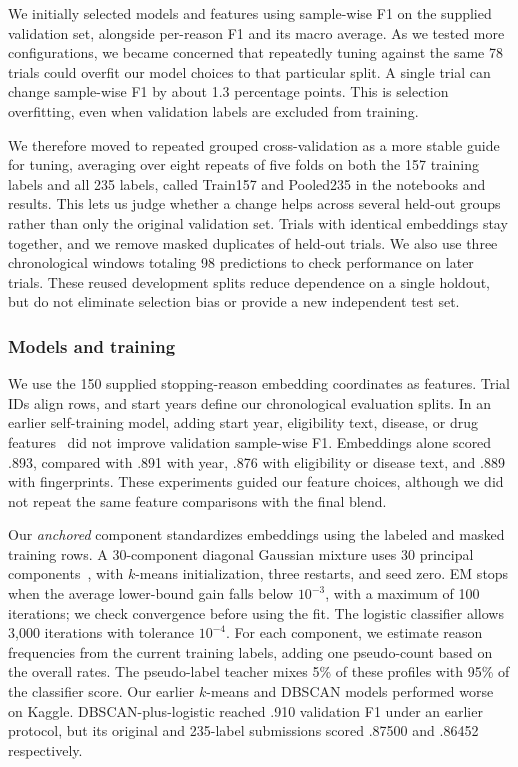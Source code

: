 \documentclass[10pt,twocolumn,letterpaper]{article}
\begin{document}
We initially selected models and features using sample-wise F1 on the supplied
validation set, alongside per-reason F1 and its macro average. As we tested
more configurations, we became concerned that repeatedly tuning against the
same 78 trials could overfit our model choices to that particular split.
A single trial can change sample-wise F1 by about 1.3 percentage points.
This is selection overfitting, even when validation labels are excluded from
training.

We therefore moved to repeated grouped cross-validation as a more stable guide
for tuning, averaging over eight repeats of five folds on both the 157 training
labels and all 235 labels, called Train157 and Pooled235 in the notebooks and results. This lets
us judge whether a change helps across
several held-out groups rather than only the original validation set. Trials
with identical embeddings stay together, and we remove masked duplicates of
held-out trials. We also use three chronological windows totaling 98
predictions to check performance on later trials. These reused development
splits reduce dependence on a single holdout, but do not eliminate selection
bias or provide a new independent test set.

\subsubsection{Models and training}

We use the 150 supplied stopping-reason embedding coordinates as features.
Trial IDs align rows, and start years define our chronological evaluation
splits. In an earlier self-training model, adding start year, eligibility text,
disease, or drug features~\cite{rogers2010extended,rdkit,milacic2024reactome}
did not improve validation sample-wise F1. Embeddings alone scored .893,
compared with .891 with year, .876 with eligibility or disease text, and .889
with fingerprints. These experiments guided our feature choices, although we
did not repeat the same feature comparisons with the final blend.

Our \emph{anchored} component standardizes embeddings using the labeled and
masked training rows. A 30-component diagonal Gaussian mixture uses 30
principal components~\cite{dempster1977em,pedregosa2011scikit}, with $k$-means
initialization, three restarts, and seed zero. EM stops when the average
lower-bound gain falls below $10^{-3}$, with a maximum of 100 iterations; we
check convergence before using the fit. The logistic classifier allows 3,000
iterations with tolerance $10^{-4}$. For each component, we estimate
reason frequencies from the current training labels, adding one pseudo-count based on the
overall rates. The pseudo-label teacher mixes 5\% of these profiles with 95\%
of the classifier score. Our earlier $k$-means and DBSCAN models performed
worse on Kaggle. DBSCAN-plus-logistic
reached .910 validation F1 under an earlier protocol, but its original and
235-label submissions scored .87500 and .86452 respectively.
\end{document}
